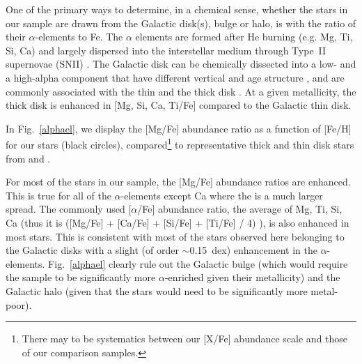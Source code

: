 \documentclass[a4paper,fleqn,usenatbib]{mnras}
\begin{document}
One of the primary ways to determine, in a chemical sense, whether the stars in our sample are drawn from the Galactic disk(s), bulge or halo, is with the ratio of their $\alpha$-elements to Fe. The $\alpha$ elements are formed after He burning (e.g. Mg, Ti, Si, Ca) and largely dispersed into the interstellar medium through Type~II supernovae (SNII) \citep{Matteucci2001}. %
The Galactic disk can be chemically dissected into a low- and a high-alpha component that have different vertical and age structure \citep[see e.g.][]{2016ApJ...823...30B,2017A&A...608L...1H,2018MNRAS.475.5487S}, and are commonly associated with the thin and the thick disk \citep[e.g.][and references therein]{Edvardsson1993, Adibekyan2012, Feltzing2013, Bensby2014}. At a given metallicity, the thick disk is enhanced in [Mg, Si, Ca, Ti/Fe] compared to the Galactic thin disk.

In Fig.~\ref{alphael}, we display the [Mg/Fe] abundance ratio as a function of [Fe/H] for our stars (black circles), compared\footnote{There may to be systematics between our [X/Fe] abundance scale and those of our comparison samples.} to representative thick and thin disk stars from \cite[open red squares]{Bensby2014} and \cite[open orange triangles]{Adibekyan2012}. 

For most of the stars in our sample, the [Mg/Fe] abundance ratios are enhanced. This is true for all of the $\alpha$-elements except Ca where the is a much larger spread. The commonly used [$\alpha$/Fe] abundance ratio, the average of Mg, Ti, Si, Ca (thus it is ([Mg/Fe] + [Ca/Fe] + [Si/Fe] + [Ti/Fe] / 4) ), is also enhanced in most stars. This is consistent with most of the stars observed here belonging to the Galactic disks with a slight (of order $\sim$0.15~dex) enhancement in the $\alpha$-elements. Fig.~\ref{alphael} clearly rule out the Galactic bulge (which would require the sample to be significantly more $\alpha$-enriched given their metallicity) and the Galactic halo (given that the stars would need to be significantly more metal-poor). %
\end{document}
